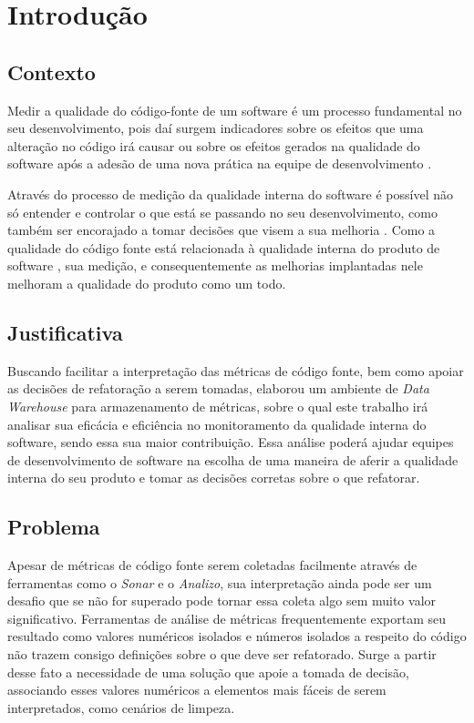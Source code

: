 \chapter{Introdução}

\section{Contexto}

Medir a qualidade do código-fonte  de um software é um processo fundamental no seu desenvolvimento, pois daí surgem indicadores sobre os efeitos que uma alteração no código irá causar ou sobre os efeitos gerados na qualidade do software após a adesão de uma nova prática na equipe de desenvolvimento \cite{Fenton98}. 

Através do processo de medição da qualidade interna do software é possível não só entender e controlar o que está se passando no seu desenvolvimento, como também ser encorajado a tomar decisões que visem a sua melhoria \cite{Fenton98}. Como a qualidade do código fonte está relacionada à qualidade interna do produto de software \cite{ISO25023}, sua medição, e consequentemente as melhorias implantadas nele melhoram a qualidade do produto como um todo. 
 

\section{Justificativa}

Buscando facilitar a interpretação das métricas de código fonte, bem como apoiar as decisões de refatoração a serem tomadas,  elaborou um ambiente de \textit{Data Warehouse} para armazenamento de métricas, sobre o qual este trabalho irá analisar sua eficácia e eficiência no monitoramento da qualidade interna do software, sendo essa sua maior contribuição. Essa análise poderá ajudar equipes de desenvolvimento de software na escolha de uma maneira de aferir a qualidade interna do seu produto e tomar as decisões corretas sobre o que refatorar.

\section{Problema}
\label{intro_problema}

Apesar de métricas de código fonte serem coletadas facilmente através de ferramentas como o \textit{Sonar} e o \textit{Analizo}, sua interpretação ainda pode ser um desafio que se não for superado pode tornar essa coleta algo sem muito valor significativo. Ferramentas de análise de métricas frequentemente exportam seu resultado como valores numéricos isolados \cite{Meirelles2013} e números isolados a respeito do código não trazem consigo definições sobre o que deve ser refatorado. Surge a partir desse fato a necessidade de uma solução que apoie a tomada de decisão, associando esses valores numéricos a elementos mais fáceis de serem interpretados, como cenários de limpeza. 

